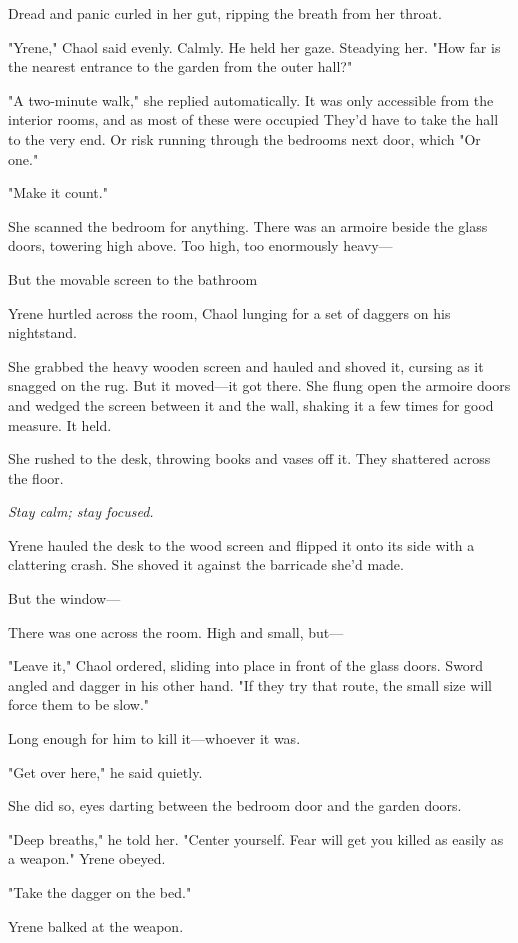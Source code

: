 Dread and panic curled in her gut, ripping the breath from her throat.

"Yrene," Chaol said evenly. Calmly. He held her gaze. Steadying her. "How far is the nearest entrance to the garden from the outer hall?"

"A two-minute walk," she replied automatically. It was only accessible from the interior rooms, and as most of these were occupied 
They'd have to take the hall to the very end. Or risk running through the bedrooms next door, which  "Or one."

"Make it count."

She scanned the bedroom for anything. There was an armoire beside the glass doors, towering high above. Too high, too enormously heavy---

But the movable screen to the bathroom 

Yrene hurtled across the room, Chaol lunging for a set of daggers on his nightstand.

She grabbed the heavy wooden screen and hauled and shoved it, cursing as it snagged on the rug. But it moved---it got there. She flung open the armoire doors and wedged the screen between it and the wall, shaking it a few times for good measure. It held.

She rushed to the desk, throwing books and vases off it. They shattered across the floor.

\emph{Stay calm; stay focused.}

Yrene hauled the desk to the wood screen and flipped it onto its side with a clattering crash. She shoved it against the barricade she'd made.

But the window---

There was one across the room. High and small, but---

"Leave it," Chaol ordered, sliding into place in front of the glass doors. Sword angled and dagger in his other hand. "If they try that route, the small size will force them to be slow."

Long enough for him to kill it---whoever it was.

"Get over here," he said quietly.

She did so, eyes darting between the bedroom door and the garden doors.

"Deep breaths," he told her. "Center yourself. Fear will get you killed as easily as a weapon." Yrene obeyed.

"Take the dagger on the bed."

Yrene balked at the weapon.

